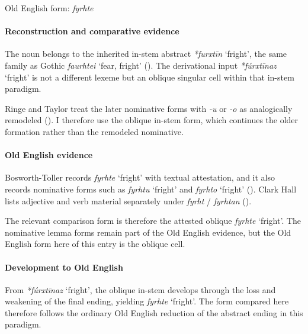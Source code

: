 \documentclass[
  british,
  a4paper,
]{article}
\providecommand{\Recon}[1]{\emph{*#1}}
\begin{document}
Old English form: \emph{fyrhte}

\paragraph{Reconstruction and comparative
evidence}\label{reconstruction-and-comparative-evidence-122}

The noun belongs to the inherited in-stem abstract \Recon{furxtīn}
`fright', the same family as Gothic {\emph{faurhtei}} `fear, fright'
(). The derivational input
\Recon{fúrxtīnaz} `fright' is not a different lexeme but an oblique
singular cell within that in-stem paradigm.

Ringe and Taylor treat the later nominative forms with \emph{-u} or
\emph{-o} as analogically remodeled
(). I
therefore use the oblique in-stem form, which continues the older
formation rather than the remodeled nominative.

\paragraph{Old English evidence}\label{old-english-evidence-122}

Bosworth-Toller records {\emph{fyrhte}} `fright' with textual
attestation, and it also records nominative forms such as
{\emph{fyrhtu}} `fright' and {\emph{fyrhto}} `fright'
().
Clark Hall lists adjective and verb material separately under
\emph{fyrht} / \emph{fyrhtan} ().

The relevant comparison form is therefore the attested oblique
{\emph{fyrhte}} `fright'. The nominative lemma forms remain part of the
Old English evidence, but the Old English form here of this entry is the
oblique cell.

\paragraph{Development to Old
English}\label{development-to-old-english-122}

From \Recon{fúrxtīnaz} `fright', the oblique in-stem develops through
the loss and weakening of the final ending, yielding {\emph{fyrhte}}
`fright'. The form compared here therefore follows the ordinary Old
English reduction of the abstract ending in this paradigm.
\end{document}
